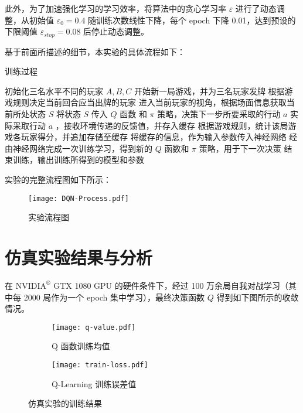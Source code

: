 此外，为了加速强化学习的学习效率，将算法中的贪心学习率 $\varepsilon$ 进行了动态调整，从初始值 $\varepsilon_0 = 0.4$ 随训练次数线性下降，每个 epoch 下降 0.01，达到预设的下限阈值 $\varepsilon_{stop} = 0.08$ 后停止动态调整。

基于前面所描述的细节，本实验的具体流程如下：

\begin{algorithm}[H]
    \caption{训练过程}
    \begin{algorithmic}[1] %
        \State 初始化三名水平不同的玩家 $A, B, C$
        \Repeat
        \State 开始新一局游戏，并为三名玩家发牌
        \Repeat
        \State 根据游戏规则决定当前回合应当出牌的玩家
        \State 进入当前玩家的视角，根据场面信息获取当前所处状态 $S$
        \State 将状态 $S$ 传入 $Q$ 函数 和 $\pi$ 策略，决策下一步所要采取的行动 $a$
        \State 实际采取行动 $a$ ，接收环境传递的反馈值，并存入缓存
        \State 根据游戏规则，统计该局游戏各玩家得分，并追加存储至缓存
        \State 将缓存的信息，作为输入参数传入神经网络
        \State 经由神经网络完成一次训练学习，得到新的 $Q$ 函数和 $\pi$ 策略，用于下一次决策
        \State 结束训练，输出训练所得到的模型和参数
    \end{algorithmic}
\end{algorithm}

实验的完整流程图如下所示：

\begin{figure}[H]
    \centering
    \texttt{[image: DQN-Process.pdf]}
    \caption{实验流程图}
\end{figure}

\section{仿真实验结果与分析}

在 $\mathrm{NVIDIA}^\circledR$ GTX 1080 GPU 的硬件条件下，经过 100 万余局自我对战学习（其中每 2000 局作为一个 epoch 集中学习），最终决策函数 $Q$ 得到如下图所示的收敛情况。

\begin{figure}[H]
	\centering
	\begin{subfigure}{0.49\textwidth} %
		\texttt{[image: q-value.pdf]}
		\caption{Q 函数训练均值}\label{img:q-value} %
	\end{subfigure}
	\vspace{1em} %
	\begin{subfigure}{0.49\textwidth} %
		\texttt{[image: train-loss.pdf]}
		\caption{Q-Learning 训练误差值}\label{img:train-loss} %
	\end{subfigure}
	\caption{仿真实验的训练结果} %
\end{figure}

